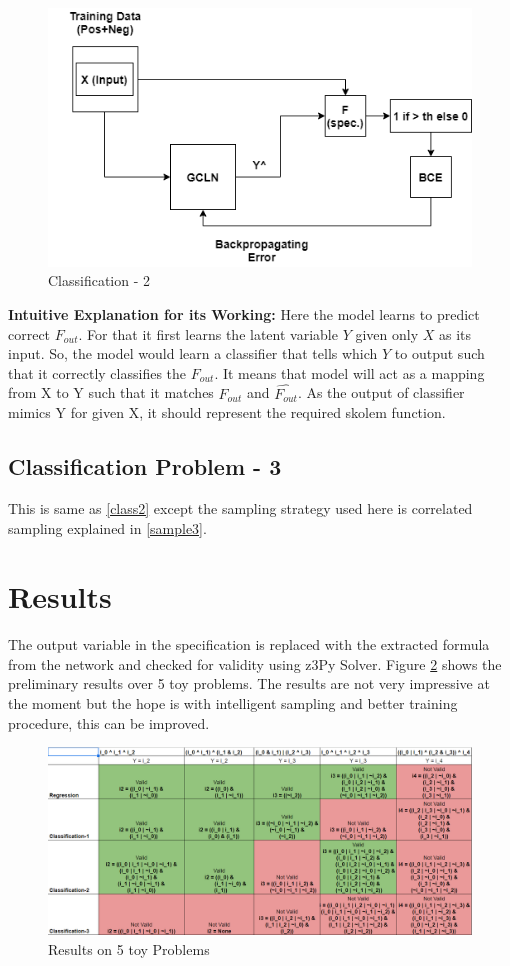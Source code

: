 \begin{figure}
	\centering
    \includegraphics[scale=0.4]{class2.png}
    \caption{Classification - 2}
    \label{fig:class2}
\end{figure}

\noindent\textbf{Intuitive Explanation for its Working: } Here the model learns to predict correct $F_{out}$.
For that it first learns the latent variable $Y$ given only $X$ as its input. So, the model would learn a classifier
that tells which $Y$ to output such that it correctly classifies the $F_{out}$. It means that model will act as a 
mapping from X to Y such that it matches $F_{out}$ and $\hat{F_{out}}$. As the output of classifier mimics Y
for given X, it should represent the required skolem function.

\subsection{Classification Problem - 3}
This is same as \ref{class2} except the sampling strategy used here is correlated sampling
explained in \ref{sample3}.

\section{Results}
The output variable in the specification is replaced with the extracted formula from the network and checked for validity using z3Py Solver.
Figure \ref{fig:results} shows the preliminary results over 5 toy problems. The results are not very impressive at the moment but the hope 
is with intelligent sampling and better training procedure, this can be improved.

\begin{figure}
	\centering
    \includegraphics[scale=0.5]{results.png}
    \caption{Results on 5 toy Problems}
    \label{fig:results}
\end{figure}